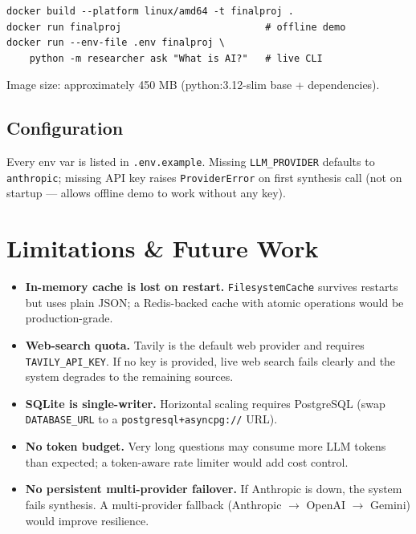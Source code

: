 \documentclass[11pt,a4paper]{article}
\begin{document}
\begin{verbatim}
docker build --platform linux/amd64 -t finalproj .
docker run finalproj                         # offline demo
docker run --env-file .env finalproj \
    python -m researcher ask "What is AI?"   # live CLI
\end{verbatim}

Image size: approximately 450 MB (python:3.12-slim base + dependencies).

\subsection{Configuration}

Every env var is listed in \texttt{.env.example}. Missing \texttt{LLM\_PROVIDER} defaults to \texttt{anthropic}; missing API key raises \texttt{ProviderError} on first synthesis call (not on startup — allows offline demo to work without any key).

\section{Limitations \& Future Work}\label{sec:limits}

\begin{itemize}
  \item \textbf{In-memory cache is lost on restart.} \texttt{FilesystemCache} survives restarts but uses plain JSON; a Redis-backed cache with atomic operations would be production-grade.
  \item \textbf{Web-search quota.} Tavily is the default web provider and requires \texttt{TAVILY\_API\_KEY}. If no key is provided, live web search fails clearly and the system degrades to the remaining sources.
  \item \textbf{SQLite is single-writer.} Horizontal scaling requires PostgreSQL (swap \texttt{DATABASE\_URL} to a \texttt{postgresql+asyncpg://} URL).
  \item \textbf{No token budget.} Very long questions may consume more LLM tokens than expected; a token-aware rate limiter would add cost control.
  \item \textbf{No persistent multi-provider failover.} If Anthropic is down, the system fails synthesis. A multi-provider fallback (Anthropic $\to$ OpenAI $\to$ Gemini) would improve resilience.
\end{itemize}

\end{document}

